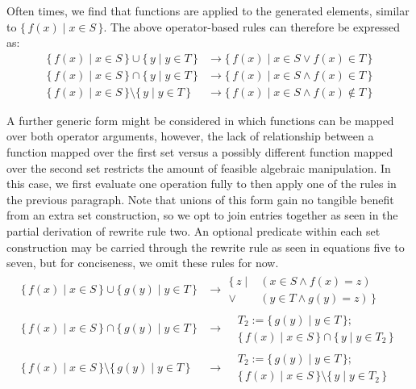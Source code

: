 \documentclass{article}
\newcommand{\Set}[2]{%
  \{\, #1 \mid #2 \, \}%
}
\begin{document}
Often times, we find that functions are applied to the generated elements, similar to $\Set{f(x)}{x \in S}$. The above operator-based rules can therefore be expressed as:
\begin{align}
  \Set{f(x)}{x \in S} \cup \Set{y}{y \in T} &\rightarrow \Set{f(x)}{x \in S \lor f(x) \in T}\\
  \Set{f(x)}{x \in S} \cap \Set{y}{y \in T} &\rightarrow \Set{f(x)}{x \in S \land f(x) \in T}\\
  \Set{f(x)}{x \in S} \setminus \Set{y}{y \in T} &\rightarrow \Set{f(x)}{x \in S \land f(x) \notin T}
\end{align}

A further generic form might be considered in which functions can be mapped over both operator arguments, however, the lack of relationship between a function mapped over the first set versus a possibly different function mapped over the second set restricts the amount of feasible algebraic manipulation. In this case, we first evaluate one operation fully to then apply one of the rules in the previous paragraph. Note that unions of this form gain no tangible benefit from an extra set construction, so we opt to join entries together as seen in the partial derivation of rewrite rule two. An optional predicate within each set construction may be carried through the rewrite rule as seen in equations five to seven, but for conciseness, we omit these rules for now.
\begin{align}
  \Set{f(x)}{x \in S} \cup \Set{g(y)}{y \in T} &\rightarrow
    \begin{split}
      \Set{z}{&(x \in S \land f(x) = z) \\\lor &(y \in T \land g(y) = z)}
    \end{split}\\
  \Set{f(x)}{x \in S} \cap \Set{g(y)}{y \in T} &\rightarrow
    \begin{split}
      &T_2 := \Set{g(y)}{y \in T};\\
      &\Set{f(x)}{x \in S} \cap \Set{y}{y \in T_2}
    \end{split}\\
  \Set{f(x)}{x \in S} \setminus \Set{g(y)}{y \in T} &\rightarrow
    \begin{split}
      &T_2 := \Set{g(y)}{y \in T};\\
      &\Set{f(x)}{x \in S} \setminus \Set{y}{y \in T_2}
    \end{split}
\end{align}
\end{document}
